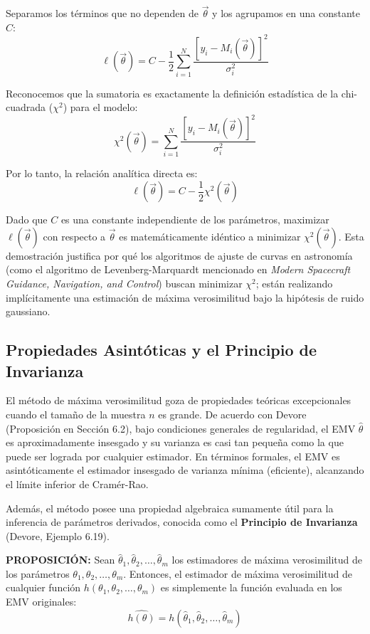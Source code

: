 Separamos los términos que no dependen de $\vec{\theta}$ y los agrupamos en una constante $C$:
$$ \ell(\vec{\theta}) = C - \frac{1}{2} \sum_{i=1}^{N} \frac{[y_i - M_i(\vec{\theta})]^2}{\sigma_i^2} $$

Reconocemos que la sumatoria es exactamente la definición estadística de la chi-cuadrada ($\chi^2$) para el modelo:
$$ \chi^2(\vec{\theta}) = \sum_{i=1}^{N} \frac{[y_i - M_i(\vec{\theta})]^2}{\sigma_i^2} $$

Por lo tanto, la relación analítica directa es:
$$ \ell(\vec{\theta}) = C - \frac{1}{2} \chi^2(\vec{\theta}) $$

Dado que $C$ es una constante independiente de los parámetros, maximizar $\ell(\vec{\theta})$ con respecto a $\vec{\theta}$ es matemáticamente idéntico a minimizar $\chi^2(\vec{\theta})$. Esta demostración justifica por qué los algoritmos de ajuste de curvas en astronomía (como el algoritmo de Levenberg-Marquardt mencionado en \textit{Modern Spacecraft Guidance, Navigation, and Control}) buscan minimizar $\chi^2$; están realizando implícitamente una estimación de máxima verosimilitud bajo la hipótesis de ruido gaussiano.

\subsection{Propiedades Asintóticas y el Principio de Invarianza}

El método de máxima verosimilitud goza de propiedades teóricas excepcionales cuando el tamaño de la muestra $n$ es grande. De acuerdo con Devore (Proposición en Sección 6.2), bajo condiciones generales de regularidad, el EMV $\hat{\theta}$ es aproximadamente insesgado y su varianza es casi tan pequeña como la que puede ser lograda por cualquier estimador. En términos formales, el EMV es asintóticamente el estimador insesgado de varianza mínima (eficiente), alcanzando el límite inferior de Cramér-Rao.

Además, el método posee una propiedad algebraica sumamente útil para la inferencia de parámetros derivados, conocida como el \textbf{Principio de Invarianza} (Devore, Ejemplo 6.19). 

\textbf{PROPOSICIÓN:} Sean $\hat{\theta}_1, \hat{\theta}_2, \dots, \hat{\theta}_m$ los estimadores de máxima verosimilitud de los parámetros $\theta_1, \theta_2, \dots, \theta_m$. Entonces, el estimador de máxima verosimilitud de cualquier función $h(\theta_1, \theta_2, \dots, \theta_m)$ es simplemente la función evaluada en los EMV originales:
$$ \widehat{h(\theta)} = h(\hat{\theta}_1, \hat{\theta}_2, \dots, \hat{\theta}_m) $$

